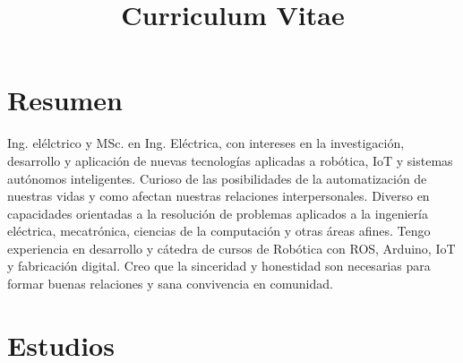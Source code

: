 \documentclass[11pt,a4paper,roman]{moderncv} %
\title{Curriculum Vitae}
\begin{document}
\makecvtitle %
\section{Resumen}
Ing. el\'elctrico y MSc. en Ing. El\'ectrica, con intereses en la investigaci\'on, desarrollo y aplicaci\'on de nuevas tecnolog\'ias aplicadas a rob\'otica, IoT y sistemas aut\'onomos inteligentes. Curioso de las posibilidades de la automatizaci\'on de nuestras vidas y como afectan nuestras relaciones interpersonales. Diverso en capacidades orientadas a la resoluci\'on de problemas aplicados a la ingenier\'ia el\'ectrica, mecatr\'onica, ciencias de la computaci\'on y otras \'areas afines. Tengo experiencia en desarrollo y c\'atedra de cursos de Rob\'otica con ROS, Arduino, IoT y fabricaci\'on digital.
Creo que la sinceridad y honestidad son necesarias para formar buenas relaciones y sana convivencia en comunidad.



\section{Estudios}




\end{document}
